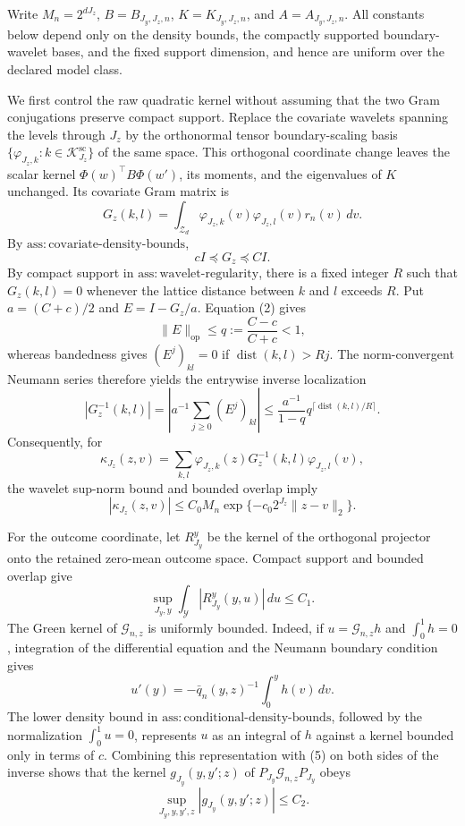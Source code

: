 Write \(M_n=2^{dJ_z}\), \(B=B_{J_y,J_z,n}\), \(K=K_{J_y,J_z,n}\), and \(A=A_{J_y,J_z,n}\). All constants below depend only on the density bounds, the compactly supported boundary-wavelet bases, and the fixed support dimension, and hence are uniform over the declared model class.

We first control the raw quadratic kernel without assuming that the two Gram conjugations preserve compact support. Replace the covariate wavelets spanning the levels through \(J_z\) by the orthonormal tensor boundary-scaling basis \(\{\varphi_{J_z,k}:k\in\mathcal K_{J_z}^{\mathrm{sc}}\}\) of the same space. This orthogonal coordinate change leaves the scalar kernel \(\Phi(w)^{\top}B\Phi(w')\), its moments, and the eigenvalues of \(K\) unchanged. Its covariate Gram matrix is
\[
G_z(k,l)=\int_{\mathcal Z_d}\varphi_{J_z,k}(v)\varphi_{J_z,l}(v)r_n(v)\,dv. \tag{1}
\]
By \(\mathrm{ass{:}covariate\text{-}density\text{-}bounds}\),
\[
cI\preceq G_z\preceq CI. \tag{2}
\]
By compact support in \(\mathrm{ass{:}wavelet\text{-}regularity}\), there is a fixed integer \(R\) such that \(G_z(k,l)=0\) whenever the lattice distance between \(k\) and \(l\) exceeds \(R\). Put \(a=(C+c)/2\) and \(E=I-G_z/a\). Equation (2) gives
\[
\|E\|_{\mathrm{op}}\le q:=\frac{C-c}{C+c}<1,
\]
whereas bandedness gives \((E^j)_{kl}=0\) if \(\operatorname{dist}(k,l)>Rj\). The norm-convergent Neumann series therefore yields the entrywise inverse localization
\[
|G_z^{-1}(k,l)|
=\left|a^{-1}\sum_{j\ge0}(E^j)_{kl}\right|
\le \frac{a^{-1}}{1-q}q^{\lceil\operatorname{dist}(k,l)/R\rceil}. \tag{3}
\]
Consequently, for
\[
\kappa_{J_z}(z,v)=\sum_{k,l}\varphi_{J_z,k}(z)G_z^{-1}(k,l)\varphi_{J_z,l}(v),
\]
the wavelet sup-norm bound and bounded overlap imply
\[
|\kappa_{J_z}(z,v)|
\le C_0M_n\exp\{-c_0 2^{J_z}\|z-v\|_2\}. \tag{4}
\]

For the outcome coordinate, let \(R^y_{J_y}\) be the kernel of the orthogonal projector onto the retained zero-mean outcome space. Compact support and bounded overlap give
\[
\sup_{J_y,y}\int_{\mathcal Y}|R^y_{J_y}(y,u)|\,du\le C_1. \tag{5}
\]
The Green kernel of \(\mathcal G_{n,z}\) is uniformly bounded. Indeed, if \(u=\mathcal G_{n,z}h\) and \(\int_0^1h=0\), integration of the differential equation and the Neumann boundary condition gives
\[
u'(y)=-\bar q_n(y,z)^{-1}\int_0^yh(v)\,dv.
\]
The lower density bound in \(\mathrm{ass{:}conditional\text{-}density\text{-}bounds}\), followed by the normalization \(\int_0^1u=0\), represents \(u\) as an integral of \(h\) against a kernel bounded only in terms of \(c\). Combining this representation with (5) on both sides of the inverse shows that the kernel \(g_{J_y}(y,y';z)\) of \(P_{J_y}\mathcal G_{n,z}P_{J_y}\) obeys
\[
\sup_{J_y,y,y',z}|g_{J_y}(y,y';z)|\le C_2. \tag{6}
\]

